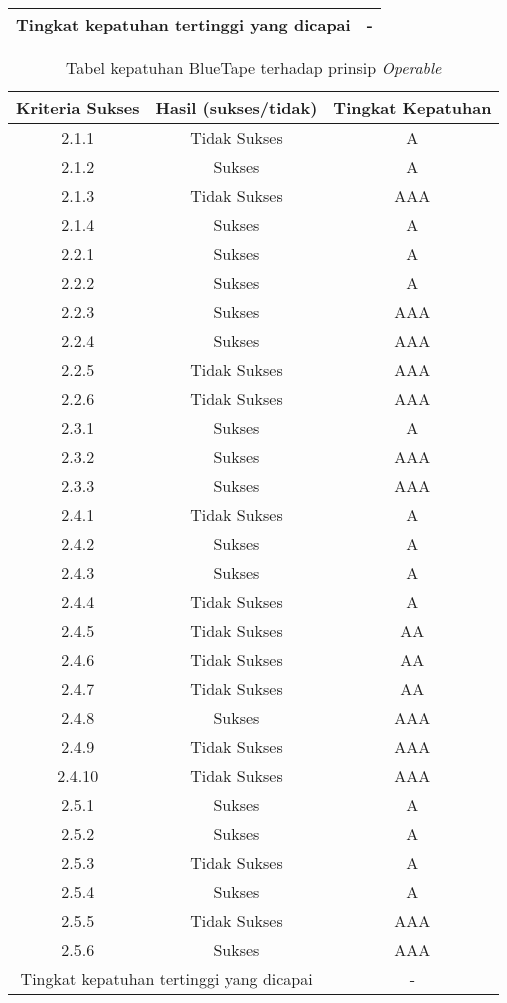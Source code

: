 \begin{table}[H]
\begin{tabular}{|c|c|c|}
        \bottomrule
        \multicolumn{2}{|c|}{Tingkat kepatuhan tertinggi yang dicapai} & - \\
        \bottomrule

    \end{tabular}
\end{table}
\begin{table}[H]
    \centering 
    \caption{Tabel kepatuhan BlueTape terhadap prinsip \textit{Operable}}
    \label{tab:kepatuhan_bluetape_operable}
    \begin{tabular}{|c|c|c|}
        \toprule
        Kriteria Sukses & Hasil (sukses/tidak) & Tingkat Kepatuhan\\

        \midrule
        2.1.1 & Tidak Sukses & A \\
        2.1.2 & Sukses & A \\
        2.1.3 & Tidak Sukses & AAA \\
        2.1.4 & Sukses & A \\
        2.2.1 & Sukses & A \\
        2.2.2 & Sukses & A \\
        2.2.3 & Sukses & AAA \\
        2.2.4 & Sukses & AAA \\
        2.2.5 & Tidak Sukses & AAA \\
        2.2.6 & Tidak Sukses & AAA \\
        2.3.1 & Sukses & A \\
        2.3.2 & Sukses & AAA \\
        2.3.3 & Sukses & AAA \\
        2.4.1 & Tidak Sukses & A \\
        2.4.2 & Sukses & A \\
        2.4.3 & Sukses & A \\
        2.4.4 & Tidak Sukses & A \\
        2.4.5 & Tidak Sukses & AA \\
        2.4.6 & Tidak Sukses & AA \\
        2.4.7 & Tidak Sukses & AA \\
        2.4.8 & Sukses & AAA \\
        2.4.9 & Tidak Sukses & AAA \\
        2.4.10 & Tidak Sukses & AAA \\
        2.5.1 & Sukses & A \\
        2.5.2 & Sukses & A \\
        2.5.3 & Tidak Sukses & A \\
        2.5.4 & Sukses & A \\
        2.5.5 & Tidak Sukses & AAA \\
        2.5.6 & Sukses & AAA \\

        \bottomrule
        \multicolumn{2}{|c|}{Tingkat kepatuhan tertinggi yang dicapai} & - \\
        \bottomrule

    \end{tabular}
\end{table}


